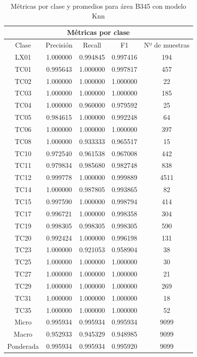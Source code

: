 \begin{table}[H]
	\centering
	\captionsetup{justification=centering}
	\begin{tabular}{|c|c|c|c|c|}
		\hline
		\multicolumn{5}{|c|}{Métricas por clase} \\ \hline
		Clase & Precisión & Recall & F1 & Nº de muestras \\ \hline \hline
		LX01 & 1.000000 & 0.994845 & 0.997416 & 194 \\ \hline
		TC01 & 0.995643 & 1.000000 & 0.997817 & 457 \\ \hline
		TC02 & 1.000000 & 1.000000 & 1.000000 & 22 \\ \hline
		TC03 & 1.000000 & 1.000000 & 1.000000 & 185 \\ \hline
		TC04 & 1.000000 & 0.960000 & 0.979592 & 25 \\ \hline
		TC05 & 0.984615 & 1.000000 & 0.992248 & 64 \\ \hline
		TC06 & 1.000000 & 1.000000 & 1.000000 & 397 \\ \hline
		TC08 & 1.000000 & 0.933333 & 0.965517 & 15 \\ \hline
		TC10 & 0.972540 & 0.961538 & 0.967008 & 442 \\ \hline
		TC11 & 0.979834 & 0.985680 & 0.982748 & 838 \\ \hline
		TC12 & 0.999778 & 1.000000 & 0.999889 & 4511 \\ \hline
		TC14 & 1.000000 & 0.987805 & 0.993865 & 82 \\ \hline
		TC15 & 0.997590 & 1.000000 & 0.998794 & 414 \\ \hline
		TC17 & 0.996721 & 1.000000 & 0.998358 & 304 \\ \hline
		TC19 & 0.998305 & 0.998305 & 0.998305 & 590 \\ \hline
		TC20 & 0.992424 & 1.000000 & 0.996198 & 131 \\ \hline
		TC23 & 1.000000 & 0.921053 & 0.958904 & 38 \\ \hline
		TC25 & 1.000000 & 1.000000 & 1.000000 & 30 \\ \hline
		TC27 & 1.000000 & 1.000000 & 1.000000 & 21 \\ \hline
		TC29 & 1.000000 & 1.000000 & 1.000000 & 269 \\ \hline
		TC31 & 1.000000 & 1.000000 & 1.000000 & 18 \\ \hline
		TC35 & 1.000000 & 1.000000 & 1.000000 & 52 \\ \hline \hline
		Micro & 0.995934 & 0.995934 & 0.995934 & 9099 \\ \hline
		Macro & 0.952933 & 0.945329 & 0.948985 & 9099 \\ \hline
		Ponderada & 0.995934 & 0.995934 & 0.995920 & 9099 \\ \hline
	\end{tabular}
	\caption{Métricas por clase y promedios para área B345 con modelo Knn}
	\label{res:knn_report_b345}	
\end{table}


